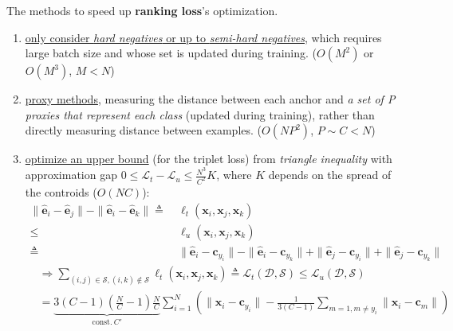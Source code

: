 The methods to speed up \textbf{ranking loss}'s optimization.
\begin{enumerate}[{(1)}]
    \item \uline{only consider \textit{hard negatives} or up to \textit{semi-hard negatives}}, which requires large batch size and whose set is updated during training. ($O(M^2)$ or $O(M^3)$, $M<N$)
    \item \uline{proxy methods}, measuring the distance between each anchor and \textit{a set of P proxies that represent each class} (updated during training), rather than directly measuring distance between examples. ($O(NP^2)$, $P\sim C<N$)
    \item {\color{gray}\uline{optimize an upper bound} (for the triplet loss) from \textit{triangle inequality} 
    with approximation gap $0\leq\mathcal{L}_t-\mathcal{L}_u\leq\frac{N^3}{C^2}K$, 
    where $K$ depends on the spread of the controids ($O(NC)$):
    {\small\begin{align}
        \|\hat{\bm{e}}_i-\hat{\bm{e}}_j\|-\|\hat{\bm{e}}_i-\hat{\bm{e}}_k\|
        \triangleq&~ \ell_t(\bm{x}_i,\bm{x}_j,\bm{x}_k) \\
        \leq&~ \ell_u(\bm{x}_i,\bm{x}_j,\bm{x}_k) \\
        \triangleq&~ \|\hat{\bm{e}}_i-\bm{c}_{y_i}\|
        -\|\hat{\bm{e}}_i-\bm{c}_{y_k}\|
        +\|\hat{\bm{e}}_j-\bm{c}_{y_i}\|
        +\|\hat{\bm{e}}_j-\bm{c}_{y_k}\|
    \end{align}
    \begin{align}
        &\Rightarrow\sum_{(i,j)\in\mathcal{S},(i,k)\notin\mathcal{S}}\ell_t(\bm{x}_i,\bm{x}_j,\bm{x}_k)
        \triangleq \mathcal{L}_t(\mathcal{D},\mathcal{S}) 
        \leq \mathcal{L}_u(\mathcal{D},\mathcal{S}) \\
        &= \underbrace{3(C-1)(\frac{N}{C}-1)\frac{N}{C}}_{\text{const.}~C'}
        \sum_{i=1}^N\left(
            \|\bm{x}_i-\bm{c}_{y_i}\| - \frac{1}{3(C-1)}\sum_{m=1,m\neq y_i} \|\bm{x}_i-\bm{c}_m\|
        \right)
    \end{align}}}
\end{enumerate}

